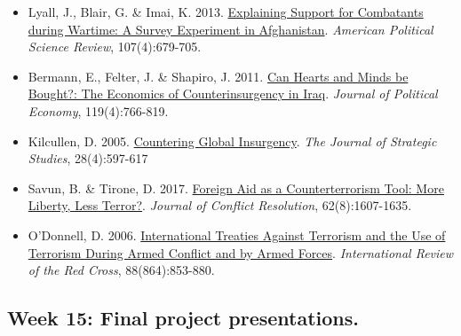 \documentclass[12pt,]{article}
\providecommand{\tightlist}{%
  \setlength{\itemsep}{0pt}\setlength{\parskip}{0pt}}
\begin{document}
\begin{itemize}
\tightlist
\item
  Lyall, J., Blair, G. \& Imai, K. 2013.
  \href{https://www.cambridge.org/core/journals/american-political-science-review/article/explaining-support-for-combatants-during-wartime-a-survey-experiment-in-afghanistan/B0E55BA87D4EBF66F0BF6135959541A7}{Explaining
  Support for Combatants during Wartime: A Survey Experiment in
  Afghanistan}. \emph{American Political Science Review},
  107(4):679-705.
\item
  Bermann, E., Felter, J. \& Shapiro, J. 2011.
  \href{http://www.jstor.org/stable/10.1086/661983}{Can Hearts and Minds
  be Bought?: The Economics of Counterinsurgency in Iraq}. \emph{Journal
  of Political Economy}, 119(4):766-819.
\item
  Kilcullen, D. 2005.
  \href{https://www.tandfonline.com/doi/abs/10.1080/01402390500300956}{Countering
  Global Insurgency}. \emph{The Journal of Strategic Studies},
  28(4):597-617
\item
  Savun, B. \& Tirone, D. 2017.
  \href{https://doi.org/10.1177/0022002717704952}{Foreign Aid as a
  Counterterrorism Tool: More Liberty, Less Terror?}. \emph{Journal of
  Conflict Resolution}, 62(8):1607-1635.
\item
  O'Donnell, D. 2006.
  \href{https://www.cambridge.org/core/journals/international-review-of-the-red-cross/article/international-treaties-against-terrorism-and-the-use-of-terrorism-during-armed-conflict-and-by-armed-forces/DCEF95D271A0778572F566936A18887F}{International
  Treaties Against Terrorism and the Use of Terrorism During Armed
  Conflict and by Armed Forces}. \emph{International Review of the Red
  Cross}, 88(864):853-880.
\end{itemize}

\hypertarget{week-15-final-project-presentations.}{%
\subsection{Week 15: Final project
presentations.}\label{week-15-final-project-presentations.}}
\end{document}
